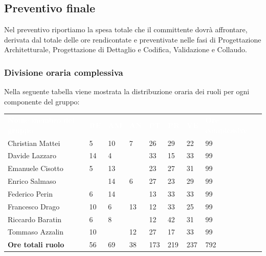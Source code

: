 \clearpage
\subsection{Preventivo finale} 
Nel preventivo riportiamo la spesa totale che il committente dovrà affrontare, derivata dal totale delle ore rendicontate e preventivate nelle fasi di Progettazione Architetturale, Progettazione di Dettaglio e Codifica, Validazione e Collaudo.

\subsubsection{Divisione oraria complessiva} 
Nella seguente tabella viene mostrata la distribuzione oraria dei ruoli per ogni componente del gruppo:
{
	\renewcommand{\arraystretch}{2}
\begin{table}[h]
		\caption{Tabella della divisione oraria complessiva}

	\begin{longtable}{ C{5cm} C{1cm} C{1cm} C{1cm} C{1cm} C{1cm} C{1cm} C{3cm}}
		\textcolor{white}{\textbf{Nome membro del gruppo}} & \textcolor{white}{\textbf{RE}} & \textcolor{white}{\textbf{AM}} & \textcolor{white}{\textbf{AN}} & \textcolor{white}{\textbf{PT}} & \textcolor{white}{\textbf{PR}} & \textcolor{white}{\textbf{VE}} & \textcolor{white}{\textbf{Ore complessive}}\\	
        
        Christian Mattei & 5 & 10 & 7 & 26 & 29 & 22 & 99 \\
        Davide Lazzaro & 14 & 4 & & 33 & 15 & 33 & 99\\
        Emanuele Cisotto & 5 & 13 & & 23 & 27 & 31 & 99 \\
        Enrico Salmaso & & 14 & 6 & 27 & 23 & 29 & 99\\
        Federico Perin & 6 & 14 & & 13 & 33 & 33 & 99\\
        Francesco Drago & 10 & 6 & 13 & 12 & 33 & 25 & 99 \\
        Riccardo Baratin & 6 & 8 & & 12 & 42 & 31 & 99 \\
        Tommaso Azzalin & 10 & & 12 & 27 & 17 & 33 & 99 \\
        \textbf{Ore totali ruolo} & 56 & 69 & 38 & 173 & 219 & 237 &  792 \\

	\end{longtable}
\end{table}
}
